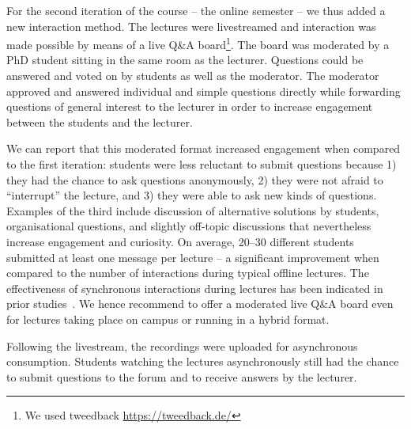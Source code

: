 For the second iteration of the course -- the online semester --
we thus added a new interaction method.
The lectures were livestreamed and
interaction was made possible by means of a live Q\&A board\footnote{We used tweedback \url{https://tweedback.de/}}.
The board was moderated by a PhD student
sitting in the same room as the lecturer.
Questions could be answered and voted on by students as well as the moderator.
The moderator approved and answered individual and simple questions directly while forwarding questions of general interest to the lecturer in order to increase engagement between the students and the lecturer.

We can report that this moderated format increased engagement when compared to the first iteration:
students were less reluctant to submit questions because
1) they had the chance to ask questions anonymously,
2) they were not afraid to ``interrupt'' the lecture, and
3) they were able to ask new kinds of questions.
Examples of the third include discussion of alternative solutions by students,
organisational questions,
and slightly off-topic discussions that nevertheless increase engagement and curiosity.
On average, 20--30 different students
submitted at least one message per lecture -- a significant improvement when compared to the number of interactions during typical offline lectures.
The effectiveness of synchronous interactions during lectures has been indicated in prior studies~\cite{onlineengagement1,onlineengagement3}.
We hence recommend to offer a moderated live Q\&A board even for lectures taking place on campus or running in a hybrid format.

Following the livestream,
the recordings were uploaded for asynchronous consumption.
Students watching the lectures asynchronously still had the chance to submit questions to the forum and to receive answers by the lecturer.

